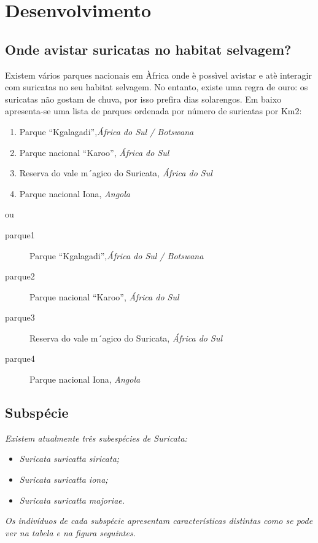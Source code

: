 \documentclass[a4paper,11pt]{report}
\begin{document}
\chapter{Desenvolvimento}
\section{Onde avistar suricatas no habitat selvagem?}
Existem vários parques nacionais em Àfrica onde è possìvel avistar e
atè interagir com suricatas no seu habitat selvagem. No entanto, existe
uma regra de ouro: os suricatas não gostam de chuva, por isso prefira
dias solarengos.
Em baixo apresenta-se uma lista de parques ordenada por número de
suricatas por Km2:

\begin{enumerate}
\item Parque “Kgalagadi”,\textit{África do Sul / Botswana}
\item Parque nacional “Karoo”, \textit{África do Sul}
\item Reserva do vale m´agico do Suricata, \textit{África do Sul}
\item Parque nacional Iona, \textit{Angola}
\end{enumerate}

ou

\begin{description}
\item[parque1] Parque “Kgalagadi”,\textit{África do Sul / Botswana}
\item[parque2] Parque nacional “Karoo”, \textit{África do Sul}
\item[parque3] Reserva do vale m´agico do Suricata, \textit{África do Sul}
\item[parque4] Parque nacional Iona, \textit{Angola}
\end{description}


\section{Subspécie}
\textit{Existem atualmente três subespécies de Suricata:}


\begin{itemize}
\item \textit{Suricata suricatta siricata;}
\item \textit{Suricata suricatta iona;}
\item \textit{Suricata suricatta majoriae.}
\end{itemize}

\textit{Os indivíduos de cada subspécie apresentam características distintas como se pode ver na tabela e na figura seguintes.}
\end{document}
